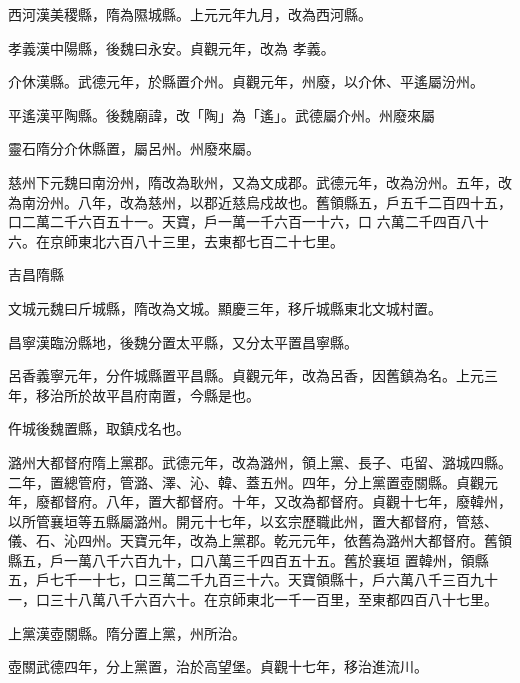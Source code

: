 \begin{pinyinscope}
 西河漢美稷縣，隋為隰城縣。上元元年九月，改為西河縣。



 孝義漢中陽縣，後魏曰永安。貞觀元年，改為
 孝義。



 介休漢縣。武德元年，於縣置介州。貞觀元年，州廢，以介休、平遙屬汾州。



 平遙漢平陶縣。後魏廟諱，改「陶」為「遙」。武德屬介州。州廢來屬



 靈石隋分介休縣置，屬呂州。州廢來屬。



 慈州下元魏曰南汾州，隋改為耿州，又為文成郡。武德元年，改為汾州。五年，改為南汾州。八年，改為慈州，以郡近慈烏戍故也。舊領縣五，戶五千二百四十五，口二萬二千六百五十一。天寶，戶一萬一千六百一十六，口
 六萬二千四百八十六。在京師東北六百八十三里，去東都七百二十七里。



 吉昌隋縣



 文城元魏曰斤城縣，隋改為文城。顯慶三年，移斤城縣東北文城村置。



 昌寧漢臨汾縣地，後魏分置太平縣，又分太平置昌寧縣。



 呂香義寧元年，分仵城縣置平昌縣。貞觀元年，改為呂香，因舊鎮為名。上元三年，移治所於故平昌府南置，今縣是也。



 仵城後魏置縣，取鎮戍名也。



 潞州大都督府隋上黨郡。武德元年，改為潞州，領上黨、長子、屯留、潞城四縣。二年，置總管府，管潞、澤、沁、韓、蓋五州。四年，分上黨置壺關縣。貞觀元年，廢都督府。八年，置大都督府。十年，又改為都督府。貞觀十七年，廢韓州，以所管襄垣等五縣屬潞州。開元十七年，以玄宗歷職此州，置大都督府，管慈、儀、石、沁四州。天寶元年，改為上黨郡。乾元元年，依舊為潞州大都督府。舊領縣五，戶一萬八千六百九十，口八萬三千四百五十五。舊於襄垣
 置韓州，領縣五，戶七千一十七，口三萬二千九百三十六。天寶領縣十，戶六萬八千三百九十一，口三十八萬八千六百六十。在京師東北一千一百里，至東都四百八十七里。



 上黨漢壺關縣。隋分置上黨，州所治。



 壺關武德四年，分上黨置，治於高望堡。貞觀十七年，移治進流川。




\end{pinyinscope}
